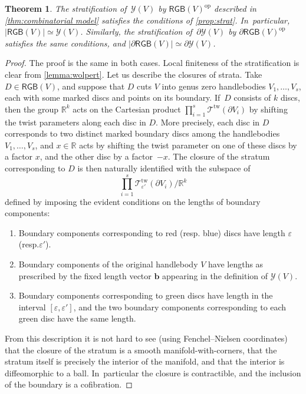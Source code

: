 \documentclass[11pt]{article}
\newcommand{\resp}{resp.\xspace}
\newcommand{\bb}{\boldsymbol{b}}
\theoremstyle{plain}
\newtheorem{thm}{Theorem}[section]
\theoremstyle{definition}
\let\eps\varepsilon
\newcommand{\R}{\mathbb R}
\newcommand{\TT}{\mathcal T^{\mathrm{tw}}}
\newcommand{\Y}{\mathcal Y}
\newcommand{\RGB}{{\mathsf{RGB}}}
\newcommand{\op}{{\mathrm{op}}}
\begin{document}
\begin{thm}\label{thm:combinatorial model 2} The stratification of $\,\Y(V)$ by $\RGB(V)^\op$ described in \cref{thm:combinatorial model} satisfies the conditions of \cref{prop:strat}. In~particular, $|\RGB(V)| \simeq \Y(V)$. Similarly, the stratification of $\,\partial \Y(V)$ by $\partial\RGB(V)^\op$ satisfies the same conditions, and $|\partial \RGB(V)| \simeq \partial\Y(V)$.
\end{thm}

\begin{proof}The proof is the same in both cases.
Local finiteness of the stratification is clear from \cref{lemma:wolpert}. Let us describe the closures of strata. Take $D \in \RGB(V)$, and suppose that $D$ cuts $V$ into genus zero handlebodies $V_1,\dots,V_s$, each with some marked discs and points on its boundary. If~$D$ consists of $k$ discs, then the group $\R^k$ acts on the Cartesian product
$\prod_{i=1}^s \TT(\partial V_i)$ by shifting the twist parameters along each disc in $D$. More precisely, each disc in $D$ corresponds to two distinct marked boundary discs among the handlebodies $V_1,\dots,V_s$, and $x \in \R$ acts by shifting the twist parameter on one of these discs by a factor $x$, and the other disc by a factor~$-x$. The closure of the stratum corresponding to $D$ is then naturally identified with the subspace of\vspace*{-3pt}\enlargethispage{.5\baselineskip}
\[
\prod_{i=1}^s \TT_{\eps'}(\partial V_i)/\R^k
\]
defined by imposing the evident conditions on the lengths of boundary components:
\begin{enumerate}
\item Boundary components corresponding to red (\resp blue) discs have length $\eps$ (\resp $\eps'$).
\item Boundary components of the original handlebody $V$ have lengths as prescribed by the fixed length vector $\bb$ appearing in the definition of $\Y(V)$.
\item Boundary components corresponding to green discs have length in the interval $[\eps,\eps']$, and the two boundary components corresponding to each green disc have the same length.
\end{enumerate}
From this description it is not hard to see (using Fenchel--Nielsen coordinates) that the closure of the stratum is a smooth manifold-with-corners, that the stratum itself is precisely the interior of the manifold, and that the interior is diffeomorphic to a ball. In~particular the closure is contractible, and the inclusion of the boundary is a cofibration.
\end{proof}
\end{document}
